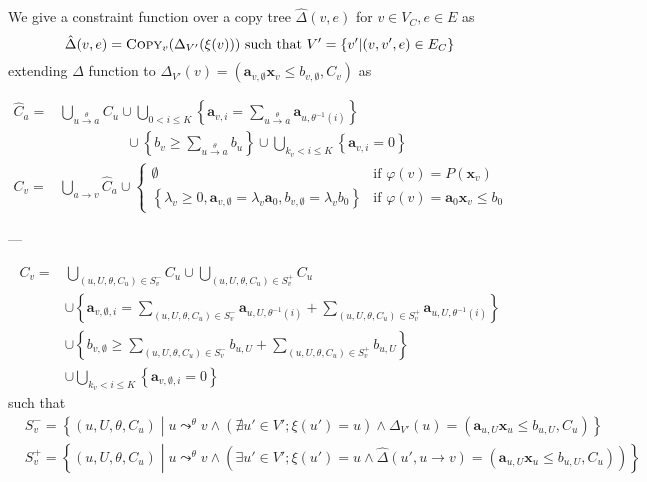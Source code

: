 \documentclass[a4paper,12pt]{article}
\newcommand{\edge}[2]{#1\rightarrow#2}
\newcommand{\edgel}[3]{#1\xrightarrow{#2}#3}
\begin{document}
We give a constraint function over a copy tree
$\hat \Delta(v,e)$ for $v \in V_C, e \in E$ as
\[ \hat \Delta (v,e) = \textsc{Copy}_v (\Delta_{V'} (\xi (v)))
\text{ such that } V' = \left\lbrace v' \middle| (v, v',e) \in E_C \right\rbrace \]
extending $\Delta$ function to
$\Delta_{V'} (v) = (\mathbf{a}_{v,\emptyset} \mathbf{x}_v \leq b_{v,\emptyset}, C_v)$
as

\begin{align*}
\hat C_a = &
 \bigcup_{\edgel{u}{\theta}{a}} C_u \cup
 \bigcup_{0 < i \leq K}
 \left\lbrace
  \mathbf{a}_{v,i} = \sum_{\edgel{u}{\theta}{a}} \mathbf{a}_{u, \theta^{-1} (i)}
 \right\rbrace \\
 & \hspace{2cm} \cup
 \left\lbrace
  b_v \geq \sum_{\edgel{u}{\theta}{a}} b_u
 \right\rbrace \cup
 \bigcup_{k_v < i \leq K}
 \left\lbrace \mathbf{a}_{v,i} = 0 \right\rbrace
\\
C_v = & \bigcup_{\edge{a}{v}} \hat C_a \cup
\begin{cases}
\emptyset
& \mbox{if } \varphi(v) = P(\mathbf{x}_v) \\
\left\lbrace
 \lambda_v \geq 0, \mathbf{a}_{v,\emptyset} = \lambda_v \mathbf{a}_0,
 b_{v,\emptyset} = \lambda_v b_0
\right\rbrace
& \mbox{if } \varphi(v) = \mathbf{a}_0 \mathbf{x}_v \leq b_0
\end{cases}
\end{align*}

---

\begin{align*}
C_v = & \bigcup_{(u,U,\theta,C_u) \in S_v^-} C_u \cup
\bigcup_{(u,U,\theta,C_u) \in S_v^+} C_u
\\
& \cup
\left\lbrace
 \mathbf{a}_{v,\emptyset,i} =
  \sum_{(u,U,\theta,C_u) \in S_v^-} \mathbf{a}_{u,U,\theta^{-1}(i)} +
  \sum_{(u,U,\theta,C_u) \in S_v^+} \mathbf{a}_{u,U, \theta^{-1}(i)}
\right\rbrace \\
& \cup \left\lbrace
 b_{v,\emptyset} \geq
  \sum_{(u,U,\theta,C_u) \in S_v^-} b_{u,U} +
  \sum_{(u,U,\theta,C_u) \in S_v^+} b_{u,U}
\right\rbrace \\
& \cup \bigcup_{k_v < i \leq K} \left\lbrace \mathbf{a}_{v,\emptyset,i} = 0 \right\rbrace
\end{align*}
such that
\begin{align*}
& S_v^- = \left\lbrace (u, U, \theta, C_u) \middle|
  u \mathop{\leadsto}^\theta v \wedge
  \left( \nexists u' \in V'; \xi (u') = u \right) \wedge
  \Delta_{V'} (u) = (\mathbf{a}_{u,U} \mathbf{x}_u \leq b_{u,U}, C_u) \right\rbrace
\\
& S_v^+ = \left\lbrace (u, U, \theta, C_u) \middle|
  u \mathop{\leadsto}^\theta v \wedge
  \left( \exists u' \in V'; \xi (u') = u \wedge
  \hat \Delta (u', \edge{u}{v}) = (\mathbf{a}_{u,U} \mathbf{x}_u \leq b_{u,U}, C_u) \right) \right\rbrace
\\
\end{align*}
\end{document}
